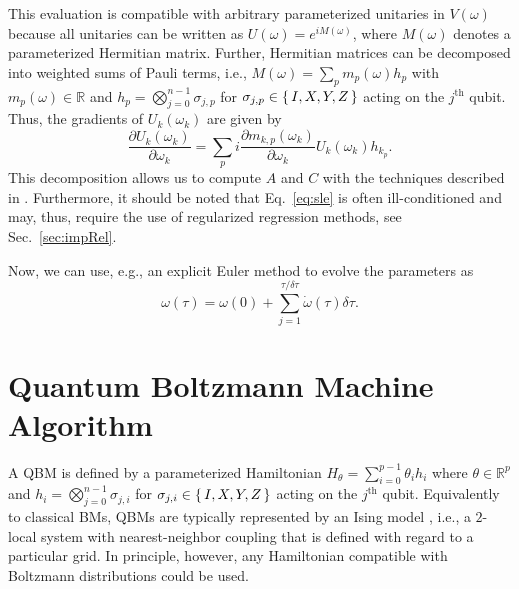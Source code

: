\documentclass[twocolumn, aps, pra, superscriptaddress, floatfix]{revtex4}
\begin{document}
This evaluation is compatible with arbitrary parameterized unitaries in $V\left(\omega\right)$ because all unitaries can be written as $U\left(\omega\right) = e^{iM\left(\omega\right)}$, where $M\left(\omega\right)$ denotes a parameterized Hermitian matrix. 
Further, Hermitian matrices can be decomposed into weighted sums of Pauli terms, i.e., $M\left(\omega\right) = \sum_pm_p\left(\omega\right)h_p$ with $m_p\left(\omega\right)\in\mathbb{R}$ and $h_p=\bigotimes\limits_{j=0}^{n-1}\sigma_{j, p}$ for $\sigma_{j, p}\in\set{I, X, Y, Z}$ \cite{nielsen10} acting on the $j^{\text{th}}$ qubit. Thus, the gradients of 
$U_k\left(\omega_k\right)$ are given by
\begin{equation*}
\frac{\partial U_k\left(\omega_k\right)}{\partial\omega_k} = \sum\limits_pi \frac{\partial m_{k,p}\left(\omega_k\right)}{\partial\omega_k}U_k\left(\omega_k\right)h_{k_p}.
\end{equation*}
This decomposition allows us to compute $A$ and $C$ with the techniques described in \cite{LaflammeSimulatingPhysPhenom02, VarSITEMcArdle19, Simon18TheoryVarQSim}.
Furthermore, it should be noted that Eq.~\eqref{eq:sle} is often ill-conditioned and may, thus, require the use of regularized regression methods, see Sec.~\ref{sec:impRel}.
 
Now, we can use, e.g., an explicit Euler method to evolve the parameters as 
\begin{equation*}
\omega\left(\tau\right) = \omega\left(0\right) + \sum\limits_{j = 1}^{\tau/\delta\tau} \dot{\omega}\left(\tau\right)\delta\tau.
\end{equation*}

\section{Quantum Boltzmann Machine Algorithm}
\label{sec:QBM}

A QBM is defined by a parameterized Hamiltonian $H_{\theta}=\sum_{i=0}^{p-1}\theta_ih_i $ where $\theta\in\mathbb{R}^p$ and $h_i=\bigotimes_{j=0}^{n-1}\sigma_{j, i}$ for $\sigma_{j, i}\in\set{I, X, Y, Z}$ acting on the $j^{\text{th}}$ qubit. 
Equivalently to classical BMs, QBMs are typically represented by an Ising model \cite{Ising1925}, i.e., a $2$-local system \cite{bravyi06LocalHam} with nearest-neighbor coupling that is defined with regard to a particular grid. In principle, however, any Hamiltonian compatible with Boltzmann distributions could be used. 
\end{document}
